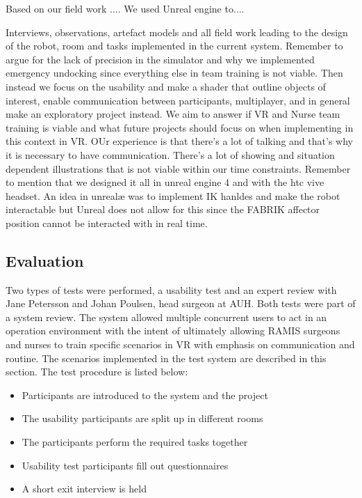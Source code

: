 \documentclass[conference]{IEEEtran}
\begin{document}
Based on our field work .... 
We used Unreal engine to.... 

Interviews, observations, artefact models and all field work leading to the design of the robot, room and tasks implemented in the current system. Remember to argue for the lack of precision in the simulator and why we implemented emergency undocking since everything else in team training is not viable. 
Then instead we focus on the usability and make a shader that outline objects of interest, enable communication between participants, multiplayer, and in general make an exploratory project instead. We aim to answer if VR and Nurse team training is viable and what future projects should focus on when implementing in this context in VR. OUr experience is that there's a lot of talking and that's why it is necessary to have communication. There's a lot of showing and situation dependent illustrations that is not viable within our time constraints. 
Remember to mention that we designed it all in unreal engine 4 and with the htc vive headset. 
An idea in unrealæ was to implement IK hanldes and make the robot interactable but Unreal does not allow for this since the FABRIK affector position cannot be interacted with in real time. 
\subsection{Evaluation}

Two types of tests were performed, a usability test and an expert review with Jane Petersson and Johan Poulsen, head surgeon at AUH. Both tests were part of a system review. The system allowed multiple concurrent users to act in an operation environment with the intent of ultimately allowing RAMIS surgeons and nurses to train specific scenarios in VR with emphasis on communication and routine. The scenarios implemented in the test system are described in this section. The test procedure is listed below:

\begin{itemize}
\item Participants are introduced to the system and the project
\item The usability participants are split up in different rooms
\item The participants perform the required tasks together
\item Usability test participants fill out questionnaires
\item A short exit interview is held
\end{itemize}
\end{document}
